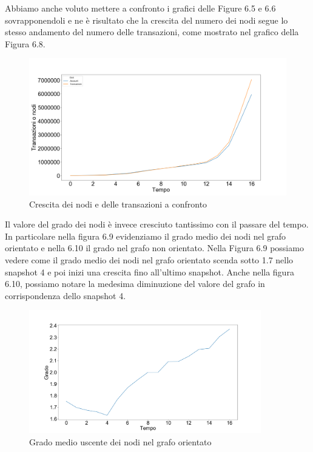 \documentclass[12pt]{report}
\begin{document}
Abbiamo anche voluto mettere a confronto i grafici delle Figure 6.5 e 6.6 sovrapponendoli e ne è risultato che la crescita del numero dei nodi segue lo stesso andamento del numero delle transazioni, come mostrato nel grafico della Figura 6.8.

\begin{figure}[H]
    \includegraphics[width=\textwidth]{NodiETransazioni.png}
    \caption{Crescita dei nodi e delle transazioni a confronto}
\end{figure}

Il valore del grado dei nodi è invece cresciuto tantissimo con il passare del tempo. 
In particolare nella figura 6.9 evidenziamo il grado medio dei nodi nel grafo orientato e nella 6.10 il grado nel grafo non orientato.
Nella Figura 6.9 possiamo vedere come il grado medio dei nodi nel grafo orientato scenda sotto 1.7 nello snapshot 4 e poi inizi una crescita fino all'ultimo snapshot.
Anche nella figura 6.10, possiamo notare la medesima diminuzione del valore del grafo in corrispondenza dello snapshot 4.


\begin{figure}[H]

\centering\includegraphics[width=0.9\textwidth]{GradoMedio.png}
\caption{Grado medio uscente dei nodi nel grafo orientato}

\end{figure}
\end{document}
